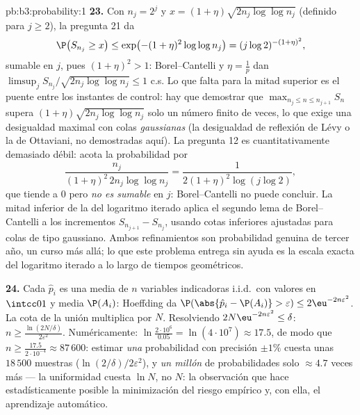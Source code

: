 \begin{solution}{pb:b3:probability:1}
\textbf{23.} Con $n_j = 2^j$ y $x = (1 +
\eta)\sqrt{2n_j\log\log n_j}$ (definido para $j \geq 2$), la pregunta 21
da
\[
\P\bigl(S_{n_j} \geq x\bigr) \leq \exp\bigl(-(1 +
\eta)^2\log\log n_j\bigr) = (j\log 2)^{-(1+\eta)^2},
\]
sumable en $j$, pues $(1 + \eta)^2 > 1$: Borel--Cantelli y
$\eta = \frac1p$ dan $\limsup_jS_{n_j}/\sqrt{2n_j
\log\log n_j} \leq 1$ c.s. Lo que falta para la mitad superior 
es el puente entre los instantes de control: hay que demostrar que
$\max_{n_j\leq n\leq n_{j+1}}S_n$ supera
$(1+\eta)\sqrt{2n_j\log\log n_j}$ solo un número finito de veces, lo que
exige una desigualdad maximal con colas \emph{gaussianas} (la
desigualdad de reflexión de Lévy o la de Ottaviani, no demostradas
aquí). La pregunta 12 es cuantitativamente demasiado débil: acota la
probabilidad por
\[
\frac{n_j}{(1+\eta)^2\,2n_j\log\log n_j}
= \frac{1}{2(1+\eta)^2\log(j\log2)},
\]
que tiende a $0$ pero \emph{no es sumable} en $j$: Borel--Cantelli no
puede concluir. La mitad inferior de la
 del logaritmo iterado aplica el
segundo lema de Borel--Cantelli a los incrementos
$S_{n_{j+1}} - S_{n_j}$, usando cotas inferiores ajustadas para colas de
tipo gaussiano. Ambos refinamientos son probabilidad genuina de tercer
año, un curso más allá; lo que este problema entrega sin ayuda es la
escala exacta del logaritmo iterado a lo largo de tiempos geométricos.

\textbf{24.} Cada $\hat p_i$ es una media de $n$ variables indicadoras
i.i.d.\ con valores en $\intcc01$ y media $\P(A_i)$: Hoeffding da
$\P(\abs{\hat p_i - \P(A_i)} >
\varepsilon) \leq 2\eu^{-2n\varepsilon^2}$. La cota de la unión
multiplica por $N$. Resolviendo $2N\eu^{-2n\varepsilon^2} \leq
\delta$: $n \geq \frac{\ln(2N/\delta)}{2\varepsilon^2}$. Numéricamente:
$\ln\frac{2\cdot10^6}{0.05} =
\ln(4\cdot10^7) \approx 17.5$, de modo que $n \geq
\frac{17.5}{2\cdot10^{-4}} \approx 87\,600$: estimar \emph{una}
probabilidad con precisión $\pm1\%$ cuesta unas $18\,500$ muestras
($\ln(2/\delta)/2\varepsilon^2$), y \emph{un millón} de probabilidades
solo $\approx 4.7$ veces más --- la uniformidad cuesta $\ln N$, no $N$:
la observación que hace estadísticamente posible la minimización del
riesgo empírico y, con ella, el aprendizaje automático.


\end{solution}
